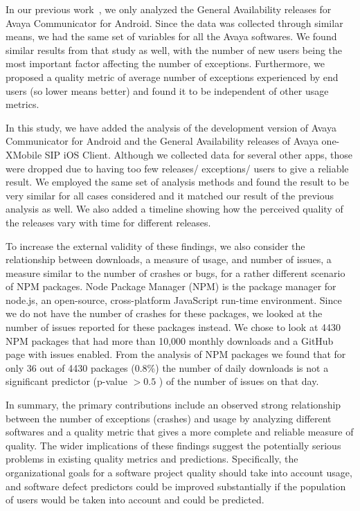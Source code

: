 \documentclass[smallextended]{svjour3}       %
\begin{document}
In our previous work~\cite{dey2018modeling}, we only analyzed the
General Availability releases for  Avaya Communicator for
Android. Since the data was collected through similar means, we had
the same set of variables for all the Avaya softwares. We found
similar results from that study as well, with the number of new
users being the most important factor affecting the number of
exceptions. 
Furthermore, we proposed a quality metric of average number of
exceptions experienced by end users (so lower means better) and
found it to be independent of other usage metrics.  

In this study, we have added the analysis of the development version 
of Avaya Communicator for Android and the
General Availability releases of Avaya one-X\textregistered  Mobile
SIP iOS Client. Although we collected data for several other apps,
those were dropped due to having too few releases/ exceptions/ users
to give a reliable result. We employed the same set of analysis
methods and found the result to be very similar for all cases
considered and it matched our result of the previous analysis as
well. We also added a timeline showing how the perceived quality of
the releases vary with time for different releases.   

To increase the external validity of these findings, we also consider
the relationship between downloads, a measure of usage, and number of 
issues, a measure similar to the number of crashes or bugs, for a rather
different scenario of NPM packages. Node Package Manager (NPM) is
the package manager for node.js, an open-source, cross-platform
JavaScript run-time environment.  Since we do not have the number of
crashes for these packages, we looked at the number of issues
reported for these packages instead. We chose to look at 4430 NPM packages
that had more than 10,000 monthly downloads and a GitHub page with issues enabled.
From the analysis of NPM packages we found that for only 36 out of
4430 packages (0.8\%) the number of daily downloads is not a
significant predictor (p-value $> 0.5$ ) of the number of issues on
that day. 

In summary, the primary contributions include an observed strong
relationship between the number of exceptions (crashes) and usage by
analyzing different softwares and a quality metric that gives a more
complete and reliable measure of quality. The wider implications of
these findings suggest the potentially serious problems in existing
quality metrics and predictions. Specifically, the organizational
goals for a software project quality should take into account usage,
and software defect predictors could be improved substantially if
the population of users would be taken into account and could be
predicted.
\end{document}
